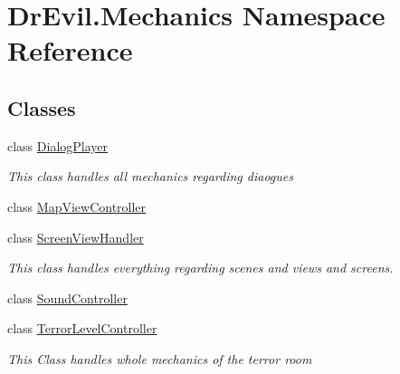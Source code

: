 \hypertarget{namespace_dr_evil_1_1_mechanics}{}\section{Dr\+Evil.\+Mechanics Namespace Reference}
\label{namespace_dr_evil_1_1_mechanics}
\subsection*{Classes}
\begin{DoxyCompactItemize}
\item 
class \mbox{\hyperlink{class_dr_evil_1_1_mechanics_1_1_dialog_player}{Dialog\+Player}}
\begin{DoxyCompactList}\small\item\em This class handles all mechanics regarding diaogues \end{DoxyCompactList}\item 
class \mbox{\hyperlink{class_dr_evil_1_1_mechanics_1_1_map_view_controller}{Map\+View\+Controller}}
\item 
class \mbox{\hyperlink{class_dr_evil_1_1_mechanics_1_1_screen_view_handler}{Screen\+View\+Handler}}
\begin{DoxyCompactList}\small\item\em This class handles everything regarding scenes and views and screens. \end{DoxyCompactList}\item 
class \mbox{\hyperlink{class_dr_evil_1_1_mechanics_1_1_sound_controller}{Sound\+Controller}}
\item 
class \mbox{\hyperlink{class_dr_evil_1_1_mechanics_1_1_terror_level_controller}{Terror\+Level\+Controller}}
\begin{DoxyCompactList}\small\item\em This Class handles whole mechanics of the terror room \end{DoxyCompactList}\end{DoxyCompactItemize}
